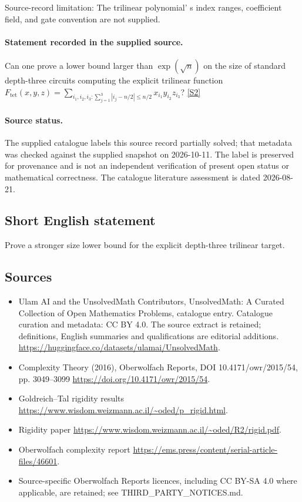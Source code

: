 \documentclass[11pt]{article}
\begin{document}
Source-record limitation: The trilinear polynomial' s index ranges, coefficient field, and gate convention are not supplied.
\paragraph{Statement recorded in the supplied source.}
Can one prove a lower bound larger than $\exp(\sqrt n)$ on the size of standard depth-three circuits computing the explicit trilinear function $F_{\mathrm{tet}}(x,y,z)=\sum_{i_1,i_2,i_3:\sum_{j=1}^3|i_j-n/2|\leq n/2}x_{i_1}y_{i_2}z_{i_3}$? \href{https://doi.org/10.4171/owr/2015/54}{[S2]}
\paragraph{Source status.}
The supplied catalogue labels this source record partially solved; that metadata was checked against the supplied snapshot on 2026-10-11. The label is preserved for provenance and is not an independent verification of present open status or mathematical correctness. The catalogue literature assessment is dated 2026-08-21.
\subsection{Short English statement}
Prove a stronger size lower bound for the explicit depth-three trilinear target.
\subsection{Sources}
\begin{itemize}
\item[S1] Ulam AI and the UnsolvedMath Contributors, UnsolvedMath: A Curated Collection of Open Mathematics Problems, catalogue entry. Catalogue curation and metadata: CC BY 4.0. The source extract is retained; definitions, English summaries and qualifications are editorial additions.
\url{https://huggingface.co/datasets/ulamai/UnsolvedMath}.
\item[S2] Complexity Theory (2016), Oberwolfach Reports, DOI 10.4171/owr/2015/54, pp. 3049--3099
\url{https://doi.org/10.4171/owr/2015/54}.
\item[S3] Goldreich--Tal rigidity results
\url{https://www.wisdom.weizmann.ac.il/~oded/p_rigid.html}.
\item[S4] Rigidity paper
\url{https://www.wisdom.weizmann.ac.il/~oded/R2/rigid.pdf}.
\item[S5] Oberwolfach complexity report
\url{https://ems.press/content/serial-article-files/46601}.
\item Source-specific Oberwolfach Reports licences, including CC BY-SA 4.0 where applicable, are retained; see THIRD\_PARTY\_NOTICES.md.
\end{itemize}
\end{document}

